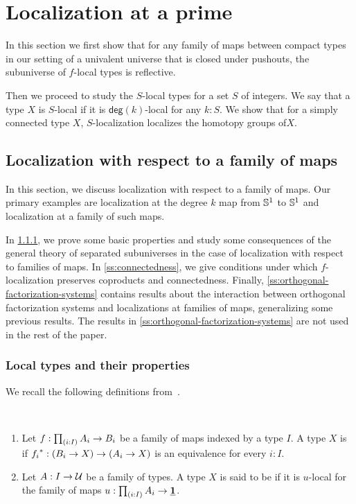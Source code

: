 \chapter{Localization at a prime}

In this section we first show that for any family of maps between compact types in our setting of a univalent universe that is closed under pushouts, the subuniverse of $f$-local types is reflective. 

Then we proceed to study the $S$-local types for a set $S$ of integers. We say that a type $X$ is $S$-local if it is $\mathsf{deg}(k)$-local for any $k:S$. We show that for a simply connected type $X$, $S$-localization localizes the homotopy groups of$X$. 

\section{Localization with respect to a family of maps}\label{section:localization}

In this section, we discuss localization with respect to a family of maps.
Our primary examples are localization at the degree $k$ map from $\mathbb{S}^{1}$ to $\mathbb{S}^{1}$
and localization at a family of such maps.

In \cref{ss:basic-properties}, we prove some basic properties and study some consequences
of the general theory of separated subuniverses in the case of localization with respect to families of maps.
In \cref{ss:connectedness}, we give conditions under which
$f$-localization preserves coproducts and connectedness.
Finally, \cref{ss:orthogonal-factorization-systems} contains results about the interaction between
orthogonal factorization systems and localizations at families of maps, generalizing some
previous results. The results in \cref{ss:orthogonal-factorization-systems} are not used in the rest
of the paper.

\subsection{Local types and their properties}\label{ss:basic-properties}

We recall the following definitions from~\cite{RSS}.
\begin{defn}\ 
\begin{enumerate}
\item    Let $f: \prd{i:I} A_i \to B_i$ be a family of maps indexed by a type $I$.
    A type $X$ is \define{$f$-local} if
    ${f_i}^\ast : (B_i \to X) \to (A_i \to X)$ is an equivalence for every $i : I$.
\item Let $A:I\to\mathcal{U}$ be a family of types. A type $X$ is said to be \define{$A$-null} if it is $u$-local for the family of maps $u:\prd{i:I}A_i\to\unit$. 
\end{enumerate}
\end{defn} 

